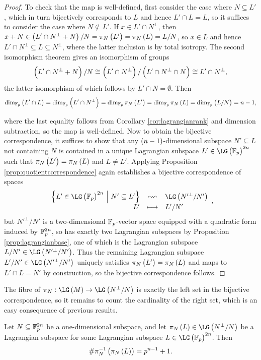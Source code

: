 \begin{proof}
To check that the map is well-defined, first consider the case where $ N \subseteq L' $, which in turn bijectively corresponds to $ L $ and hence $ L' \cap L = L $, so it suffices to consider the case where $ N \not\subseteq L' $. If $ x \in L' \cap N^\perp $, then $ x + N \in \br{L' \cap N^\perp + N} / N = \pi_N\br{L'} = \pi_N\br{L} = L / N $, so $ x \in L $ and hence $ L' \cap N^\perp \subseteq L \subseteq N^\perp $, where the latter inclusion is by total isotropy. The second isomorphism theorem gives an isomorphism of groups
$$ \br{L' \cap N^\perp + N} / N \cong \br{L' \cap N^\perp} / \br{L' \cap N^\perp \cap N} \cong L' \cap N^\perp, $$
the latter isomorphism of which follows by $ L' \cap N = \emptyset $. Then
$$ \dim_{\FF_p} \br{L' \cap L} = \dim_{\FF_p} \br{L' \cap N^\perp} = \dim_{\FF_p} \pi_N\br{L'} = \dim_{\FF_p} \pi_N\br{L} = \dim_{\FF_p} \br{L / N} = n - 1, $$

\pagebreak

\noindent
where the last equality follows from Corollary \ref{cor:lagrangianrank} and dimension subtraction, so the map is well-defined. Now to obtain the bijective correspondence, it suffices to show that any $ \br{n - 1} $-dimensional subspace $ N' \subseteq L $ not containing $ N $ is contained in a unique Lagrangian subspace $ L' \in \LG\br{\FF_p}^{2n} $ such that $ \pi_N\br{L'} = \pi_N\br{L} $ and $ L \ne L' $. Applying Proposition \ref{prop:quotientcorrespondence} again establishes a bijective correspondence of spaces
$$ \bijection{\cbr{L' \in \LG\br{\FF_p}^{2n} \st N' \subseteq L'}}{\LG\br{N'^\perp / N'}}{L'}{L' / N'}, $$
but $ N'^\perp / N' $ is a two-dimensional $ \mathbb{F}_p $-vector space equipped with a quadratic form induced by $ \mathbb{F}_p^{2n} $, so has exactly two Lagrangian subspaces by Proposition \ref{prop:lagrangianbase}, one of which is the Lagrangian subspace $ L / N' \in \LG\br{N'^\perp / N'} $. Thus the remaining Lagrangian subspace $ L' / N' \in \LG\br{N'^\perp / N'} $ uniquely satisfies $ \pi_N\br{L'} = \pi_N\br{L} $ and maps to $ L' \cap L = N' $ by construction, so the bijective correspondence follows.
\end{proof}

The fibre of $ \pi_N : \LG\br{M} \to \LG\br{N^\perp / N} $ is exactly the left set in the bijective correspondence, so it remains to count the cardinality of the right set, which is an easy consequence of previous results.

\begin{corollary}
\label{cor:lagrangianinductive}
Let $ N \subseteq \mathbb{F}_p^{2n} $ be a one-dimensional subspace, and let $ \pi_N\br{L} \in \LG\br{N^\perp / N} $ be a Lagrangian subspace for some Lagrangian subspace $ L \in \LG\br{\FF_p}^{2n} $. Then
$$ \#\pi_N^{-1}\br{\pi_N\br{L}} = p^{n - 1} + 1. $$
\end{corollary}

